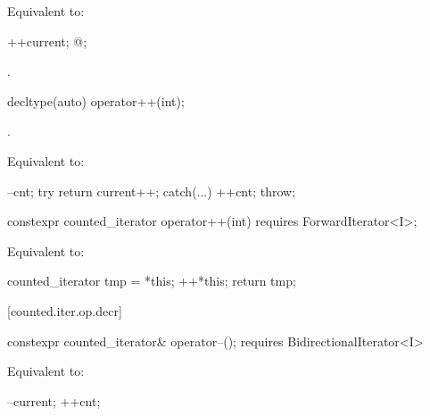\begin{addedblock}
\begin{itemdescr}
\pnum
\oldtxt{\requires} \newtxt{\expects}

\pnum
\effects Equivalent to:
\begin{codeblock}
++current;
@\dcr@cnt;
\end{codeblock}

\pnum
\returns {}.
\end{itemdescr}

%
%
\begin{itemdecl}
decltype(auto) operator++(int);
\end{itemdecl}

\begin{itemdescr}
\pnum
\oldtxt{\requires} \newtxt{\expects}
.

\pnum
\effects Equivalent to:
\begin{codeblock}
--cnt;
try { return current++; }
catch(...) { ++cnt; throw; }
\end{codeblock}
\end{itemdescr}

\begin{itemdecl}
constexpr counted_iterator operator++(int)
  requires ForwardIterator<I>;
\end{itemdecl}

\begin{itemdescr}
\pnum
\oldtxt{\requires} \newtxt{\expects}

\pnum
\effects Equivalent to:
\begin{codeblock}
counted_iterator tmp = *this;
++*this;
return tmp;
\end{codeblock}
\end{itemdescr}

[counted.iter.op.decr]{}

%
%
\begin{itemdecl}
  constexpr counted_iterator& operator--();
    requires BidirectionalIterator<I>
\end{itemdecl}

\begin{itemdescr}
\pnum
\effects Equivalent to:
\begin{codeblock}
--current;
++cnt;
\end{codeblock}


\end{itemdescr}
\end{addedblock}
